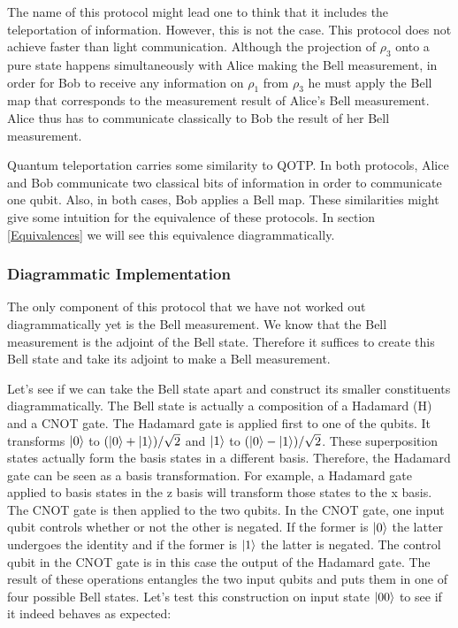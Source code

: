 \documentclass[]{article}
\begin{document}
The name of this protocol might lead one to think that it includes the teleportation of information. However, this is not the case. This protocol does not achieve faster than light communication. Although the projection of $\rho_{3}$ onto a pure state happens simultaneously with Alice making the Bell measurement, in order for Bob to receive any information on $\rho_1$ from $\rho_{3}$ he must apply the Bell map that corresponds to the measurement result of Alice's Bell measurement. Alice thus has to communicate classically to Bob the result of her Bell measurement.

Quantum teleportation carries some similarity to QOTP. In both protocols, Alice and Bob communicate two classical bits of information in order to communicate one qubit. Also, in both cases, Bob applies a Bell map. These similarities might give some intuition for the equivalence of these protocols. In section \ref{Equivalences} we will see this equivalence diagrammatically.

\subsubsection{Diagrammatic Implementation}

The only component of this protocol that we have not worked out diagrammatically yet is the Bell measurement. We know that the Bell measurement is the adjoint of the Bell state. Therefore it suffices to create this Bell state and take its adjoint to make a Bell measurement.

Let's see if we can take the Bell state apart and construct its smaller constituents diagrammatically. The Bell state is actually a composition of a Hadamard (H) and a CNOT gate. The Hadamard gate is applied first to one of the qubits. It transforms $\ket{0}$ to  $(\ket{0} + \ket{1})/\sqrt{2}$ and $\ket{1}$ to $(\ket{0} - \ket{1})/\sqrt{2}$. These superposition states actually form the basis states in a different basis. Therefore, the Hadamard gate can be seen as a basis transformation. For example, a Hadamard gate applied to basis states in the z basis will transform those states to the x basis. The CNOT gate is then applied to the two qubits. In the CNOT gate, one input qubit controls whether or not the other is negated. If the former is $\ket{0}$ the latter undergoes the identity and if the former is $\ket{1}$ the latter is negated. The control qubit in the CNOT gate is in this case the output of the Hadamard gate. The result of these operations entangles the two input qubits and puts them in one of four possible Bell states. Let's test this construction on input state $\ket{00}$ to see if it indeed behaves as expected:
\end{document}
